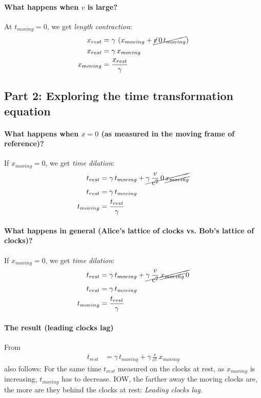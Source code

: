 \documentclass[pagesize,headsepline,10pt,parskip=half]{scrreprt}
\newcommand{\const}[1]{\ensuremath{\mathrm{#1}}}
\renewcommand{\c}{\const{c}}
\begin{document}
        \paragraph{What happens when $v$ is large?}
          At $t_{moving} = 0$, we get \emph{length contraction}:
          \begin{align*}
            x_{rest} &= \gamma \, \left(x_{moving} + \cancel{\cancel{v} \, 0 \, t_{moving}}\right)\\
            x_{rest} &= \gamma \, x_{moving}\\
            x_{moving} &= \frac{x_{rest}}{\gamma}
          \end{align*}

      \subsection{Part 2: Exploring the time transformation equation}
        \paragraph{What happens when $x = 0$ (as measured in the moving frame of reference)?}
          If $x_{moving} = 0$, we get \emph{time dilation}:
          \begin{align*}
            t_{rest} &= \gamma \, t_{moving} + \cancel{\gamma \, \frac{v}{\c^2} \, 0 \, \cancel{x_{moving}}}\\
            t_{rest} &= \gamma \, t_{moving}\\
            t_{moving} &= \frac{t_{rest}}{\gamma}
          \end{align*}
        \paragraph{What happens in general (Alice’s lattice of clocks vs. Bob’s lattice of clocks)?}
          If $x_{moving} = 0$, we get \emph{time dilation}:
          \begin{align*}
            t_{rest} &= \gamma \, t_{moving} + \cancel{\gamma \, \frac{v}{\c^2} \, \cancel{x_{moving}} \, 0}\\
            t_{rest} &= \gamma \, t_{moving}\\
            t_{moving} &= \frac{t_{rest}}{\gamma}
          \end{align*}
        \paragraph{The result (leading clocks lag)}
          From
          \begin{align*}
            t_{rest} &= \gamma \, t_{moving} + \gamma \, \frac{v}{\c^2} \, x_{moving}
          \end{align*}
          also follows: For the same time $t_{rest}$ measured on the clocks
          at rest, as $x_{moving}$ is increasing, $t_{moving}$ has to decrease.
          IOW, the farther away the moving clocks are, the more are they behind
          the clocks at rest: \emph{Leading clocks lag.}
\end{document}
